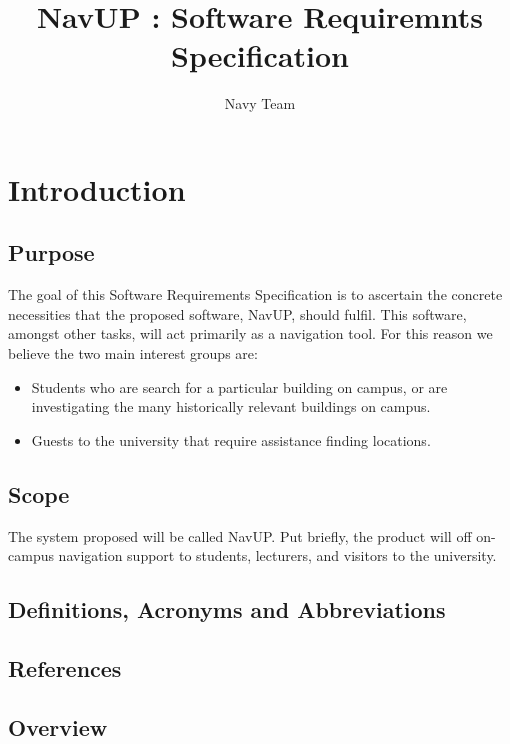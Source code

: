 \documentclass[10pt,a4paper]{article}
\author{Navy Team}
\title{NavUP : Software Requiremnts Specification}
\begin{document}
	\maketitle

	\section{Introduction}

		\subsection{Purpose}

		The goal of this Software Requirements Specification is to ascertain the
		concrete necessities that the proposed software, NavUP, should fulfil. This
		software, amongst other tasks, will act primarily as a navigation tool. For
		this reason we believe the two main interest groups are:

		\begin{itemize}
			\item Students who are search for a particular building on campus, or are
						investigating the many historically relevant buildings on campus.

			\item Guests to the university that require assistance finding locations.
		\end{itemize}


		\subsection{Scope}

			The system proposed will be called NavUP. Put briefly, the product will
			off on-campus navigation support to students, lecturers, and visitors to
			the university.

		\subsection{Definitions, Acronyms and Abbreviations}

		\subsection{References}

		\subsection{Overview}
\end{document}

